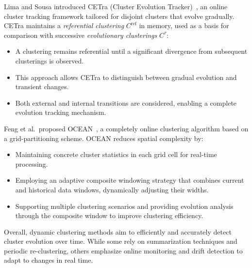 Lima and Sousa introduced CETra (Cluster Evolution Tracker)~\cite{cetra}, an
online cluster tracking framework tailored for disjoint clusters that evolve
gradually. CETra maintains a \emph{referential clustering} $C^{\text{ref}}$
in memory, used as a basis for comparison with successive \emph{evolutionary
    clusterings} $C^{\tau}$:

\begin{itemize}
    \item A clustering remains referential until a significant divergence from subsequent
          clusterings is observed.
    \item This approach allows CETra to distinguish between gradual evolution and
          transient changes.
    \item Both external and internal transitions are considered, enabling a complete
          evolution tracking mechanism.
\end{itemize}

Feng et al.\ proposed OCEAN~\cite{ocean}, a completely online clustering
algorithm based on a grid-partitioning scheme. OCEAN reduces spatial complexity
by:

\begin{itemize}
    \item Maintaining concrete cluster statistics in each grid cell for real-time
          processing.
    \item Employing an adaptive composite windowing strategy that combines current and
          historical data windows, dynamically adjusting their widths.
    \item Supporting multiple clustering scenarios and providing evolution analysis
          through the composite window to improve clustering efficiency.
\end{itemize}

Overall, dynamic clustering methods aim to efficiently and accurately detect
cluster evolution over time. While some rely on summarization techniques and
periodic re-clustering, others emphasize online monitoring and drift detection
to adapt to changes in real time.